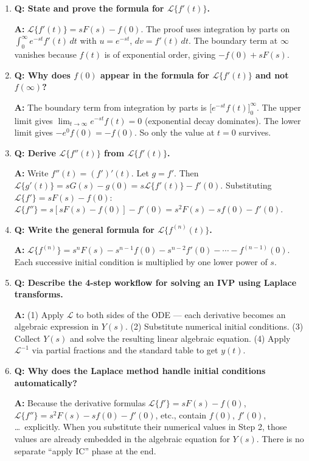 \documentclass[12pt,a4paper]{article}
\begin{document}
\begin{enumerate}

\item \textbf{Q: State and prove the formula for $\mathcal{L}\{f'(t)\}$.}

\textbf{A:} $\mathcal{L}\{f'(t)\} = sF(s) - f(0)$. The proof uses
integration by parts on $\int_0^\infty e^{-st} f'(t)\,dt$ with $u =
e^{-st}$, $dv = f'(t)\,dt$. The boundary term at $\infty$ vanishes
because $f(t)$ is of exponential order, giving $-f(0) + sF(s)$.

\item \textbf{Q: Why does $f(0)$ appear in the formula for
$\mathcal{L}\{f'(t)\}$ and not $f(\infty)$?}

\textbf{A:} The boundary term from integration by parts is
$\bigl[e^{-st}f(t)\bigr]_0^\infty$. The upper limit gives
$\lim_{t\to\infty}e^{-st}f(t) = 0$ (exponential decay dominates). The
lower limit gives $-e^{0}f(0) = -f(0)$. So only the value at $t=0$
survives.

\item \textbf{Q: Derive $\mathcal{L}\{f''(t)\}$ from $\mathcal{L}\{f'(t)\}$.}

\textbf{A:} Write $f''(t) = (f')'(t)$. Let $g = f'$. Then
$\mathcal{L}\{g'(t)\} = sG(s) - g(0) = s\mathcal{L}\{f'(t)\} - f'(0)$.
Substituting $\mathcal{L}\{f'\} = sF(s)-f(0)$:
$\mathcal{L}\{f''\} = s[sF(s)-f(0)] - f'(0) = s^2F(s)-sf(0)-f'(0)$.

\item \textbf{Q: Write the general formula for $\mathcal{L}\{f^{(n)}(t)\}$.}

\textbf{A:}
$\mathcal{L}\{f^{(n)}\} = s^n F(s) - s^{n-1}f(0) - s^{n-2}f'(0) -
\cdots - f^{(n-1)}(0)$.
Each successive initial condition is multiplied by one lower power of
$s$.

\item \textbf{Q: Describe the 4-step workflow for solving an IVP using
Laplace transforms.}

\textbf{A:} (1) Apply $\mathcal{L}$ to both sides of the ODE --- each
derivative becomes an algebraic expression in $Y(s)$. (2) Substitute
numerical initial conditions. (3) Collect $Y(s)$ and solve the resulting
linear algebraic equation. (4) Apply $\mathcal{L}^{-1}$ via partial
fractions and the standard table to get $y(t)$.

\item \textbf{Q: Why does the Laplace method handle initial conditions
automatically?}

\textbf{A:} Because the derivative formulas $\mathcal{L}\{f'\} =
sF(s)-f(0)$, $\mathcal{L}\{f''\} = s^2F(s)-sf(0)-f'(0)$, etc.,
contain $f(0)$, $f'(0)$, \ldots\ explicitly. When you substitute their
numerical values in Step 2, those values are already embedded in the
algebraic equation for $Y(s)$. There is no separate ``apply IC'' phase
at the end.


\end{enumerate}
\end{document}
